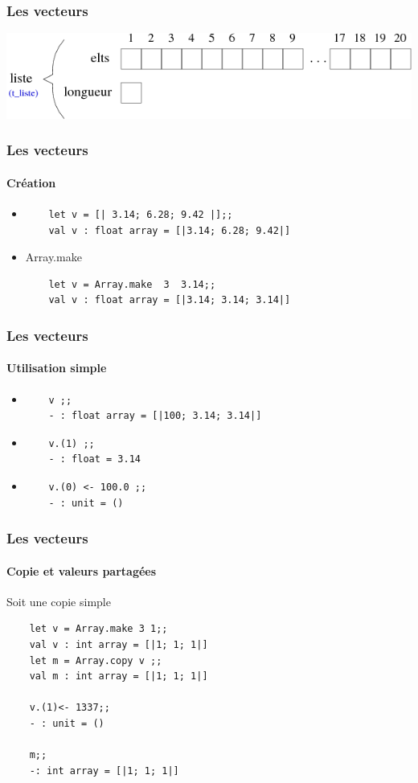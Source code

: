 \begin{frame}
	\frametitle{Les vecteurs}
	\includegraphics[scale=0.5]{pics/vect.png}
\end{frame}

\begin{frame}[fragile]
	\frametitle{Les vecteurs}
	\framesubtitle{Création}
	\begin{itemize}
	\item
	\begin{lstlisting}
	let v = [| 3.14; 6.28; 9.42 |];;
	val v : float array = [|3.14; 6.28; 9.42|]
	\end{lstlisting}

	\item Array.make
	\begin{lstlisting}
	let v = Array.make  3  3.14;;
	val v : float array = [|3.14; 3.14; 3.14|]
	\end{lstlisting}

	\end{itemize}
\end{frame}


\begin{frame}[fragile]
	\frametitle{Les vecteurs}
	\framesubtitle{Utilisation simple}
	\begin{itemize}
	\item
	\begin{lstlisting}
	v ;;
	- : float array = [|100; 3.14; 3.14|]
	\end{lstlisting}

	\item
	\begin{lstlisting}
	v.(1) ;;
	- : float = 3.14
	\end{lstlisting}

	\item
	\begin{lstlisting}
	v.(0) <- 100.0 ;;
	- : unit = ()
	\end{lstlisting}
	\end{itemize}
\end{frame}

\begin{frame}[fragile]
	\frametitle{Les vecteurs}
	\framesubtitle{Copie et valeurs partagées}
	\begin{block}{Soit une copie simple}
	\begin{lstlisting}
	let v = Array.make 3 1;;
	val v : int array = [|1; 1; 1|]
	let m = Array.copy v ;;
	val m : int array = [|1; 1; 1|]

	v.(1)<- 1337;;
	- : unit = ()

	m;;
	-: int array = [|1; 1; 1|]
	\end{lstlisting}
	\end{block}
\end{frame}

